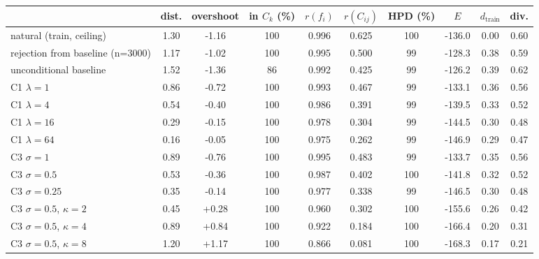 \begin{tabular}{lccccccccc}
\toprule
 & dist. & overshoot & in $C_k$ (\%) & $r(f_i)$ & $r(C_{ij})$ & HPD (\%) & $E$ & $d_\text{train}$ & div. \\
\midrule
natural (train, ceiling) & 1.30 & -1.16 & 100 & 0.996 & 0.625 & 100 & -136.0 & 0.00 & 0.60 \\
rejection from baseline (n=3000) & 1.17 & -1.02 & 100 & 0.995 & 0.500 & 99 & -128.3 & 0.38 & 0.59 \\
unconditional baseline & 1.52 & -1.36 & 86 & 0.992 & 0.425 & 99 & -126.2 & 0.39 & 0.62 \\
\midrule
C1 $\lambda{=}1$ & 0.86 & -0.72 & 100 & 0.993 & 0.467 & 99 & -133.1 & 0.36 & 0.56 \\
C1 $\lambda{=}4$ & 0.54 & -0.40 & 100 & 0.986 & 0.391 & 99 & -139.5 & 0.33 & 0.52 \\
C1 $\lambda{=}16$ & 0.29 & -0.15 & 100 & 0.978 & 0.304 & 99 & -144.5 & 0.30 & 0.48 \\
C1 $\lambda{=}64$ & 0.16 & -0.05 & 100 & 0.975 & 0.262 & 99 & -146.9 & 0.29 & 0.47 \\
\midrule
C3 $\sigma{=}1$ & 0.89 & -0.76 & 100 & 0.995 & 0.483 & 99 & -133.7 & 0.35 & 0.56 \\
C3 $\sigma{=}0.5$ & 0.53 & -0.36 & 100 & 0.987 & 0.402 & 100 & -141.8 & 0.32 & 0.52 \\
C3 $\sigma{=}0.25$ & 0.35 & -0.14 & 100 & 0.977 & 0.338 & 99 & -146.5 & 0.30 & 0.48 \\
C3 $\sigma{=}0.5$, $\kappa{=}2$ & 0.45 & +0.28 & 100 & 0.960 & 0.302 & 100 & -155.6 & 0.26 & 0.42 \\
C3 $\sigma{=}0.5$, $\kappa{=}4$ & 0.89 & +0.84 & 100 & 0.922 & 0.184 & 100 & -166.4 & 0.20 & 0.31 \\
C3 $\sigma{=}0.5$, $\kappa{=}8$ & 1.20 & +1.17 & 100 & 0.866 & 0.081 & 100 & -168.3 & 0.17 & 0.21 \\
\bottomrule
\end{tabular}
